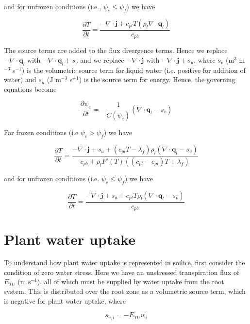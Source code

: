 \documentclass[10pt,a4paper]{article}
\begin{document}
and for unfrozen conditions (i.e., $\psi_e\leq\psi_f$) we have

\begin{equation}
\frac{\partial T}{\partial t} = \frac{-\nabla\cdot\mathbf{j}+c_{pl}T(\rho_l\nabla\cdot\mathbf{q}_l)}{c_{pb}}
\end{equation}

The source terms are added to the flux divergence terms. Hence we replace $-\nabla\cdot\mathbf{q}_l$ with $-\nabla\cdot\mathbf{q}_l + s_v$ and we replace $-\nabla\cdot\mathbf{j}$ with $-\nabla\cdot\mathbf{j}+s_u$, where $s_v$ (m$^3$ m$^{-3}$ s$^{-1}$) is the volumetric source term for liquid water (i.e. positive for addition of water) and $s_u$ (J m$^{-3}$ s$^{-1}$) is the source term for energy. Hence, the governing equations become

\begin{equation}
\frac{\partial \psi_e}{\partial t}=-\frac{1}{C(\psi_e)}(\nabla\cdot\mathbf{q}_l-s_v)
\end{equation}

For frozen conditions (i.e $\psi_e>\psi_f$) we have

\begin{equation}
\frac{\partial T}{\partial t} = \frac{-\nabla\cdot\mathbf{j}+s_u+(c_{pi}T-\lambda_f)\rho_l(\nabla\cdot\mathbf{q}_l-s_v)}{c_{pb}+\rho_lF'(T)((c_{pl}-c_{pi})T+\lambda_f)}
\end{equation}

and for unfrozen conditions (i.e. $\psi_e\leq\psi_f$) we have

\begin{equation} \label{eq: unfrozEbalSource}
\frac{\partial T}{\partial t} = \frac{-\nabla\cdot\mathbf{j}+s_u+c_{pl}T\rho_l(\nabla\cdot\mathbf{q}_l-s_v)}{c_{pb}}
\end{equation}

\section{Plant water uptake}

To understand how plant water uptake is represented in soilice, first consider the condition of zero water stress. Here we have an unstressed transpiration flux of $E_{TU}$ (m s$^{-1}$), all of which must be supplied by water uptake from the root system. This is distributed over the root zone as a volumetric source term, which is negative for plant water uptake, where 

\begin{equation}
	s_{v,i}=-E_{TU} w_i
\end{equation}
\end{document}
